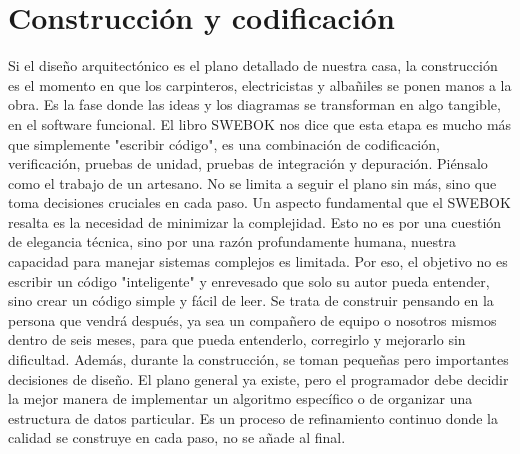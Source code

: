 \section{Construcción y codificación}
Si el diseño arquitectónico es el plano detallado de nuestra casa, la construcción es el momento en que los carpinteros, electricistas y albañiles se ponen manos a la obra. Es la fase donde las ideas y los diagramas se transforman en algo tangible, en el software funcional. El libro SWEBOK nos dice que esta etapa es mucho más que simplemente "escribir código", es una combinación de codificación, verificación, pruebas de unidad, pruebas de integración y depuración.
Piénsalo como el trabajo de un artesano. No se limita a seguir el plano sin más, sino que toma decisiones cruciales en cada paso. Un aspecto fundamental que el SWEBOK resalta es la necesidad de minimizar la complejidad. Esto no es por una cuestión de elegancia técnica, sino por una razón profundamente humana, nuestra capacidad para manejar sistemas complejos es limitada. Por eso, el objetivo no es escribir un código "inteligente" y enrevesado que solo su autor pueda entender, sino crear un código simple y fácil de leer. Se trata de construir pensando en la persona que vendrá después, ya sea un compañero de equipo o nosotros mismos dentro de seis meses, para que pueda entenderlo, corregirlo y mejorarlo sin dificultad.
Además, durante la construcción, se toman pequeñas pero importantes decisiones de diseño. El plano general ya existe, pero el programador debe decidir la mejor manera de implementar un algoritmo específico o de organizar una estructura de datos particular. Es un proceso de refinamiento continuo donde la calidad se construye en cada paso, no se añade al final.
